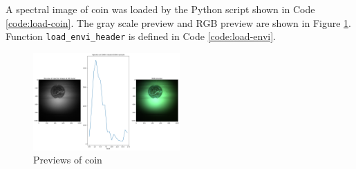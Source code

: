 A spectral image of coin was loaded by the Python script shown in
Code \ref{code:load-coin}. The gray scale preview and RGB preview are
shown in Figure \ref{fig:coin-preview}.
Function \texttt{load\_envi\_header} is defined in Code \ref{code:load-envi}.

\begin{figure}[H]
  \centering
  \caption{Previews of coin}
  \label{fig:coin-preview}
  \includegraphics[width=0.5\textwidth]{./fig-task3/coin.png}
\end{figure}
